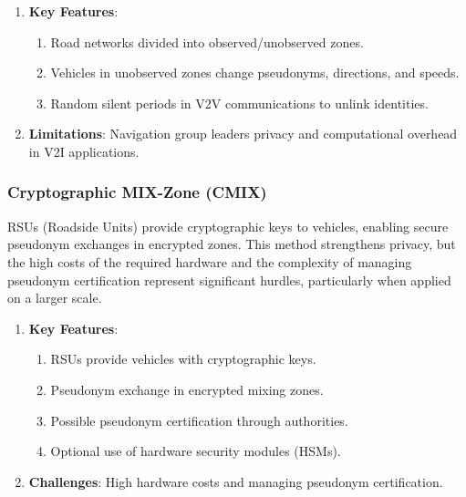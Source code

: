 \begin{enumerate}
    \item \textbf{Key Features}:
    \begin{enumerate}
        \item Road networks divided into observed/unobserved zones.
        \item Vehicles in unobserved zones change pseudonyms, directions, and speeds.
        \item Random silent periods in V2V communications to unlink identities.
    \end{enumerate}
    \item \textbf{Limitations}: Navigation group leaders privacy and computational overhead in V2I applications.
\end{enumerate}

\subsubsection{Cryptographic MIX-Zone (CMIX)}
RSUs (Roadside Units) provide cryptographic keys to vehicles, enabling secure pseudonym exchanges in encrypted zones.
This method strengthens privacy, but the high costs of the required hardware and the complexity of managing pseudonym certification represent significant hurdles, particularly when applied on a larger scale.
\begin{enumerate}
    \item \textbf{Key Features}:
    \begin{enumerate}
        \item RSUs provide vehicles with cryptographic keys.
        \item Pseudonym exchange in encrypted mixing zones.
        \item Possible pseudonym certification through authorities.
        \item Optional use of hardware security modules (HSMs).
    \end{enumerate}
    \item \textbf{Challenges}: High hardware costs and managing pseudonym certification.
\end{enumerate}

